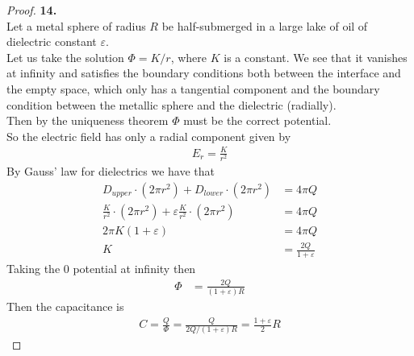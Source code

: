 \documentclass[11pt]{article}
\theoremstyle{definition}
\begin{document}
\cleardoublepage
\begin{proof}{\textbf{14.}}\\
Let a metal sphere of radius $R$ be half-submerged in a large lake of oil of
dielectric constant $\varepsilon$.
\\
Let us take the solution $\Phi = K/r$, where $K$ is a constant.
We see that it vanishes at infinity and satisfies the boundary conditions both
between the interface and the empty space, which only has a tangential
component and the boundary condition between the metallic sphere and the
dielectric (radially).
\\
Then by the uniqueness theorem $\Phi$ must be the correct potential.
\\
So the electric field has only a radial component given by
\begin{align*}
    E_r = \frac{K}{r^2}
\end{align*}
By Gauss' law for dielectrics we have that
\begin{align*}
    D_{upper}\cdot(2\pi r^2) + D_{lower} \cdot (2\pi r^2) &= 4\pi Q\\
    \frac{K}{r^2}\cdot(2\pi r^2)
    + \varepsilon\frac{K}{r^2}\cdot(2\pi r^2)
    &= 4\pi Q\\
    2\pi K(1 + \varepsilon)
    &= 4\pi Q\\
    K &= \frac{2Q}{1 + \varepsilon}
\end{align*}
Taking the 0 potential at infinity then
\begin{align*}
    \Phi &= \frac{2Q}{(1 + \varepsilon)R}
\end{align*}
Then the capacitance is 
\begin{align*}
    C = \frac{Q}{\Phi} = \frac{Q}{2Q/(1 + \varepsilon)R} = \frac{1 + \varepsilon}{2}R
\end{align*}
\end{proof}
\end{document}
